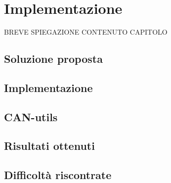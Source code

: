 \chapter{Implementazione} %
%

\begin{citazione}
BREVE SPIEGAZIONE CONTENUTO CAPITOLO
\end{citazione}

\section{Soluzione proposta}

\section{Implementazione}

\section{CAN-utils}

\section{Risultati ottenuti}

\section{Difficoltà riscontrate}


\newpage

